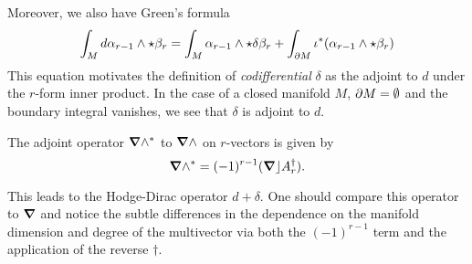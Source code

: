 Moreover, we also have Green's formula
\begin{equation}
\int_M d\alpha_{r-1} \wedge \star \beta_r = \int_M \alpha_{r-1} \wedge \star \delta \beta_r + \int_{{\partial M}} \iota^* (\alpha_{r-1} \wedge \star \beta_r)
\end{equation}
This equation motivates the definition of \emph{codifferential} $\delta$ as the adjoint to $d$ under the $r$-form inner product. In the case of a closed manifold $M$, ${\partial M} = \emptyset$ and the boundary integral vanishes, we see that $\delta$ is adjoint to $d$.

\begin{definition}
The adjoint operator $\boldsymbol{\nabla} \wedge^*$ to $\boldsymbol{\nabla} \wedge$ on $r$-vectors is given by
\begin{equation}
\boldsymbol{\nabla} \wedge^* = (-1)^{r-1} (\boldsymbol{\nabla} \rfloor A_r^\dagger).
\end{equation}
\end{definition}
This leads to the Hodge-Dirac operator $d+\delta$. One should compare this operator to $\boldsymbol{\nabla}$ and notice the subtle differences in the dependence on the manifold dimension and degree of the multivector via both the $(-1)^{r-1}$ term and the application of the reverse $\dagger$.

